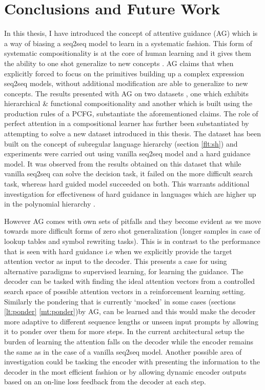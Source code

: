 \chapter{Conclusions and Future Work} \label{Chapter:conclusion}%
In this thesis, I have introduced the concept of attentive guidance (AG) which is a way of biasing a seq2seq model to learn in a systematic fashion. This form of systematic compositionality is at the core of human learning \citep{marcus2003algebraic} and it gives them the ability to one shot generalize to new concepts \citep{Lake2016}. AG claims that when explicitly forced to focus on the primitives building up a complex expression seq2seq models, without additional modification are able to generalize to new concepts. The results presented with AG on two datasets , one which exhibits hierarchical \& functional compositionality and another which is built using the production rules of a PCFG, substantiate the aforementioned claims. The role of perfect attention in a compositional learner has further been substantiated by attempting to solve a new dataset introduced in this thesis. The dataset has been built on the concept of subregular language hierarchy (section \ref{flt:sh}) and experiments were carried out using vanilla seq2seq model and a hard guidance model. It was observed from the results obtained on this dataset that while vanilla seq2seq can solve the decision task, it failed on the more difficult search task, whereas hard guided model succeeded on both. This warrants additional investigation for effectiveness of hard guidance in languages which are higher up in the polynomial hierarchy \citep{arora2009computational}. 

However AG comes with own sets of pitfalls and they become evident as we move towards more difficult forms of zero shot generalization (longer samples in case of lookup tables and symbol rewriting tasks). This is in contrast to the performance that is seen with hard guidance i.e when we explicitly provide the target attention vector as input to the decoder. This presents a case for using alternative paradigms to supervised learning, for learning the guidance. The decoder can be tasked with finding the ideal attention vectors from a controlled search space of possible attention vectors in a reinforcement learning \citep{sutton2018reinforcement} setting. Similarly the pondering that is currently \lq mocked\rq{} in some cases (sections \ref{lt:ponder} \ref{mt:ponder})by AG, can be learned and this would make the decoder more adaptive to different sequence lengths or unseen input prompts by allowing it to ponder over them for more steps. In the current architectural setup the burden of learning the attention falls on the decoder while the encoder remains the same as in the case of a vanilla seq2seq model. Another possible area of investigation could be tasking the encoder with presenting the information to the decoder in the most efficient fashion or by allowing dynamic encoder outputs based on an on-line loss feedback from the decoder at each step. 

